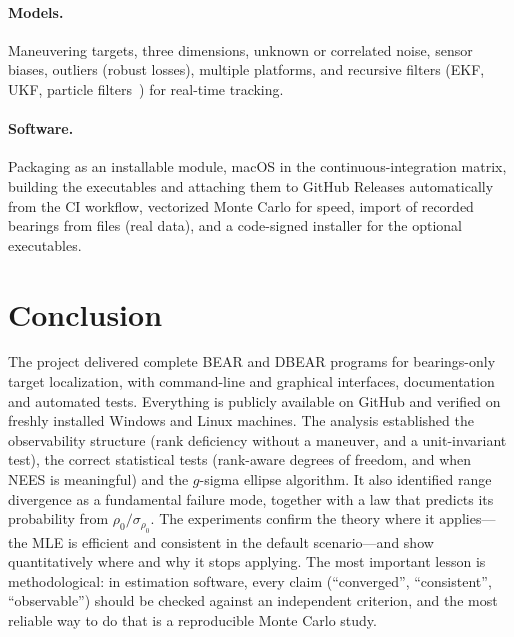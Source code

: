 \documentclass[11pt,a4paper]{article}
\theoremstyle{plain}
\theoremstyle{remark}
\begin{document}
\paragraph{Models.} Maneuvering targets, three dimensions, unknown or
correlated noise, sensor biases, outliers (robust losses), multiple
platforms, and recursive filters (EKF, UKF, particle filters~\cite{ristic04})
for real-time tracking.

\paragraph{Software.} Packaging as an installable module, macOS in the
continuous-integration matrix, building the executables and attaching them to
GitHub Releases automatically from the CI workflow, vectorized Monte Carlo
for speed, import of recorded bearings from files (real data), and a
code-signed installer for the optional executables.

\section{Conclusion}
\label{sec:conclusion}

The project delivered complete BEAR and DBEAR programs for bearings-only
target localization, with command-line and graphical interfaces,
documentation and \testsTotal{} automated tests. Everything is publicly
available on GitHub and verified on freshly installed Windows and Linux
machines. The analysis established
the observability structure (rank deficiency without a maneuver, and a
unit-invariant test), the correct statistical tests (rank-aware degrees of
freedom, and when NEES is meaningful) and the $g$-sigma ellipse algorithm. It
also identified range divergence as a fundamental failure mode, together with
a law that predicts its probability from $\rho_0/\sigma_{\rho_0}$. The
experiments confirm the theory where it applies---the MLE is efficient and
consistent in the default scenario---and show quantitatively where and why it
stops applying. The most important lesson is methodological: in estimation
software, every claim (``converged'', ``consistent'', ``observable'') should
be checked against an independent criterion, and the most reliable way to do
that is a reproducible Monte Carlo study.
\end{document}
